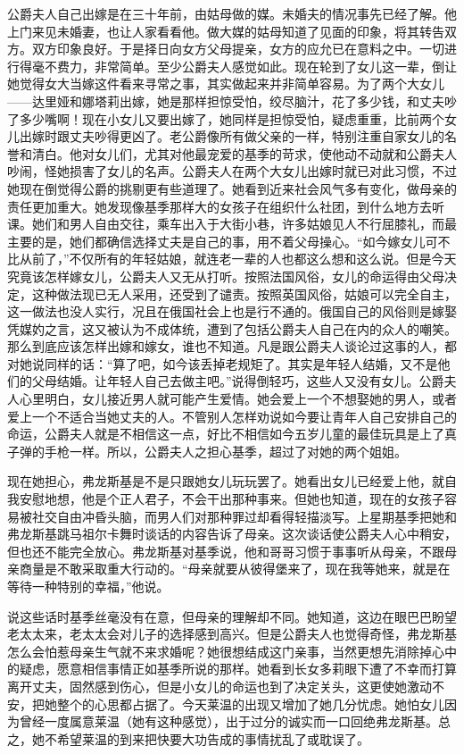 \par 公爵夫人自己出嫁是在三十年前，由姑母做的媒。未婚夫的情况事先已经了解。他上门来见未婚妻，也让人家看看他。做大媒的姑母知道了见面的印象，将其转告双方。双方印象良好。于是择日向女方父母提亲，女方的应允已在意料之中。一切进行得毫不费力，非常简单。至少公爵夫人感觉如此。现在轮到了女儿这一辈，倒让她觉得女大当嫁这件看来寻常之事，其实做起来并非简单容易。为了两个大女儿——达里娅和娜塔莉出嫁，她是那样担惊受怕，绞尽脑汁，花了多少钱，和丈夫吵了多少嘴啊！现在小女儿又要出嫁了，她同样是担惊受怕，疑虑重重，比前两个女儿出嫁时跟丈夫吵得更凶了。老公爵像所有做父亲的一样，特别注重自家女儿的名誉和清白。他对女儿们，尤其对他最宠爱的基季的苛求，使他动不动就和公爵夫人吵闹，怪她损害了女儿的名声。公爵夫人在两个大女儿出嫁时就已对此习惯，不过她现在倒觉得公爵的挑剔更有些道理了。她看到近来社会风气多有变化，做母亲的责任更加重大。她发现像基季那样大的女孩子在组织什么社团，到什么地方去听课。她们和男人自由交往，乘车出入于大街小巷，许多姑娘见人不行屈膝礼，而最主要的是，她们都确信选择丈夫是自己的事，用不着父母操心。“如今嫁女儿可不比从前了，”不仅所有的年轻姑娘，就连老一辈的人也都这么想和这么说。但是今天究竟该怎样嫁女儿，公爵夫人又无从打听。按照法国风俗，女儿的命运得由父母决定，这种做法现已无人采用，还受到了谴责。按照英国风俗，姑娘可以完全自主，这一做法也没人实行，况且在俄国社会上也是行不通的。俄国自己的风俗则是嫁娶凭媒妁之言，这又被认为不成体统，遭到了包括公爵夫人自己在内的众人的嘲笑。那么到底应该怎样出嫁和嫁女，谁也不知道。凡是跟公爵夫人谈论过这事的人，都对她说同样的话：“算了吧，如今该丢掉老规矩了。其实是年轻人结婚，又不是他们的父母结婚。让年轻人自己去做主吧。”说得倒轻巧，这些人又没有女儿。公爵夫人心里明白，女儿接近男人就可能产生爱情。她会爱上一个不想娶她的男人，或者爱上一个不适合当她丈夫的人。不管别人怎样劝说如今要让青年人自己安排自己的命运，公爵夫人就是不相信这一点，好比不相信如今五岁儿童的最佳玩具是上了真子弹的手枪一样。所以，公爵夫人之担心基季，超过了对她的两个姐姐。
\par 现在她担心，弗龙斯基是不是只跟她女儿玩玩罢了。她看出女儿已经爱上他，就自我安慰地想，他是个正人君子，不会干出那种事来。但她也知道，现在的女孩子容易被社交自由冲昏头脑，而男人们对那种罪过却看得轻描淡写。上星期基季把她和弗龙斯基跳马祖尔卡舞时谈话的内容告诉了母亲。这次谈话使公爵夫人心中稍安，但也还不能完全放心。弗龙斯基对基季说，他和哥哥习惯于事事听从母亲，不跟母亲商量是不敢采取重大行动的。“母亲就要从彼得堡来了，现在我等她来，就是在等待一种特别的幸福，”他说。
\par 说这些话时基季丝毫没有在意，但母亲的理解却不同。她知道，这边在眼巴巴盼望老太太来，老太太会对儿子的选择感到高兴。但是公爵夫人也觉得奇怪，弗龙斯基怎么会怕惹母亲生气就不来求婚呢？她很想结成这门亲事，当然更想先消除掉心中的疑虑，愿意相信事情正如基季所说的那样。她看到长女多莉眼下遭了不幸而打算离开丈夫，固然感到伤心，但是小女儿的命运也到了决定关头，这更使她激动不安，把她整个的心思都占据了。今天莱温的出现又增加了她几分忧虑。她怕女儿因为曾经一度属意莱温（她有这种感觉），出于过分的诚实而一口回绝弗龙斯基。总之，她不希望莱温的到来把快要大功告成的事情扰乱了或耽误了。
